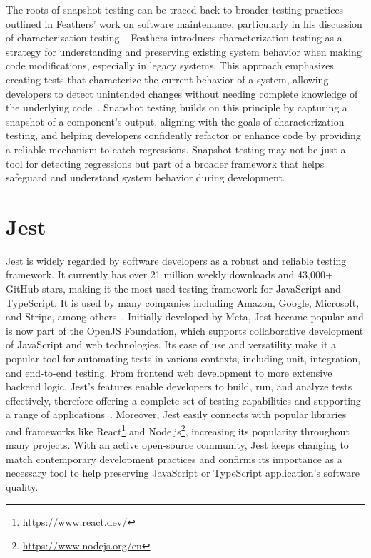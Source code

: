 \documentclass[
	msc, %
	english %
]{../ppgccufmg}
\begin{document}
    The roots of snapshot testing can be traced back to broader testing practices outlined in Feathers’ work on software maintenance, particularly in his discussion of characterization testing~\cite{feathers2004legacy}. Feathers introduces characterization testing as a strategy for understanding and preserving existing system behavior when making code modifications, especially in legacy systems. This approach emphasizes creating tests that characterize the current behavior of a system, allowing developers to detect unintended changes without needing complete knowledge of the underlying code~\cite{feathers2004legacy}. Snapshot testing builds on this principle by capturing a snapshot of a component’s output, aligning with the goals of characterization testing, and helping developers confidently refactor or enhance code by providing a reliable mechanism to catch regressions. Snapshot testing may not be just a tool for detecting regressions but part of a broader framework that helps safeguard and understand system behavior during development.

    \section{Jest}\label{sec:ch2-jest}

    Jest is widely regarded by software developers as a robust and reliable testing framework. It currently has over 21 million weekly downloads and 43,000+ GitHub stars, making it the most used testing framework for JavaScript and TypeScript. It is used by many companies including Amazon, Google, Microsoft, and Stripe, among others~\cite{OpenJS2024}. Initially developed by Meta, Jest became popular and is now part of the OpenJS Foundation, which supports collaborative development of JavaScript and web technologies. Its ease of use and versatility make it a popular tool for automating tests in various contexts, including unit, integration, and end-to-end testing.
    From frontend web development to more extensive backend logic, Jest's features enable developers to build, run, and analyze tests effectively, therefore offering a complete set of testing capabilities and supporting a range of applications~\cite{Jest22}. Moreover, Jest easily connects with popular libraries and frameworks like React\footnote{\url{https://www.react.dev/}} and Node.js\footnote{\url{https://www.nodejs.org/en}}, increasing its popularity throughout many projects. With an active open-source community, Jest keeps changing to match contemporary development practices and confirms its importance as a necessary tool to help preserving JavaScript or TypeScript application's software quality.
\end{document}
